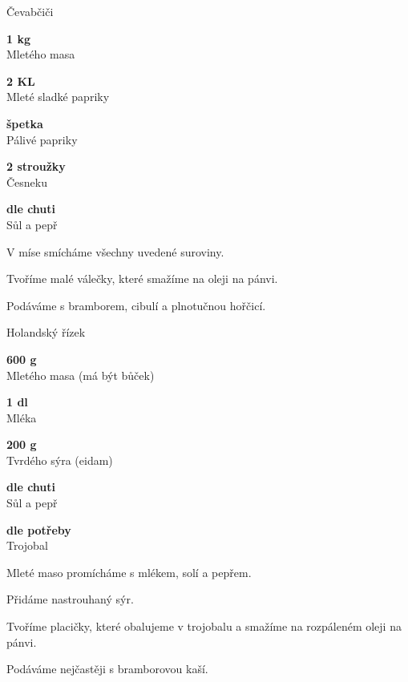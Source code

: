 \documentclass[11pt,a4paper]{article}
\begin{document}
\begin{recipe}[OrangeRed]{Čevabčiči}
    \begin{ingredients}
        \item \parbox[t]{\linewidth}{\raggedright \weight \textbf{1 kg}\\ Mletého masa}
        \item \parbox[t]{\linewidth}{\raggedright \spoon \textbf{2 KL}\\ Mleté sladké papriky}
        \item \parbox[t]{\linewidth}{\raggedright \indefinite \textbf{špetka}\\ Pálivé papriky}
        \item \parbox[t]{\linewidth}{\raggedright \piece \textbf{2 stroužky}\\ Česneku}
        \item \parbox[t]{\linewidth}{\raggedright \indefinite \textbf{dle chuti}\\ Sůl a pepř}
    \end{ingredients}
    \begin{steps}
        \item V míse smícháme všechny uvedené suroviny.
        \item Tvoříme malé válečky, které smažíme na oleji na pánvi.
        \item Podáváme s bramborem, cibulí a plnotučnou hořčicí.
    \end{steps}
\end{recipe}

\begin{recipe}[SeaGreen]{Holandský řízek}
    \begin{ingredients}
        \item \parbox[t]{\linewidth}{\raggedright \weight \textbf{600 g}\\ Mletého masa (má být bůček)}
        \item \parbox[t]{\linewidth}{\raggedright \liquid \textbf{1 dl}\\ Mléka}
        \item \parbox[t]{\linewidth}{\raggedright \weight \textbf{200 g}\\ Tvrdého sýra (eidam)}
        \item \parbox[t]{\linewidth}{\raggedright \indefinite \textbf{dle chuti}\\ Sůl a pepř}
        \item \parbox[t]{\linewidth}{\raggedright \indefinite \textbf{dle potřeby}\\ Trojobal}
    \end{ingredients}
    \begin{steps}
        \item Mleté maso promícháme s mlékem, solí a pepřem.
        \item Přidáme nastrouhaný sýr.
        \item Tvoříme placičky, které obalujeme v trojobalu a smažíme na rozpáleném oleji na pánvi.
        \item Podáváme nejčastěji s bramborovou kaší.
    \end{steps}
\end{recipe}
\end{document}
